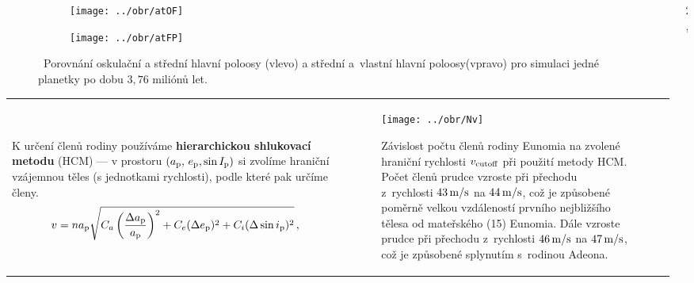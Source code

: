 \documentclass{beamer}
\newlength{\sep}
\newlength{\vyska}
\newlength{\vyskaA}
\newlength{\side}
\begin{document}
\begin{frame}
\begin{columns}[t]
\begin{column}{\side}
\begin{tcolorbox}[title=Metody\phantom{Úy},height=0.64\vyskaA]
		\begin{figure}
			\centering
			\begin{subfigure}[b]{0.49\textwidth}
			\centering
			\texttt{[image: ../obr/atOF]}
			\end{subfigure}
			\begin{subfigure}[b]{0.49\textwidth}
			\centering
			\texttt{[image: ../obr/atFP]}
			\end{subfigure}
			\caption{\ Porovnání oskulační a střední hlavní poloosy (vlevo) a střední a~vlastní hlavní poloosy(vpravo) pro simulaci jedné planetky po dobu $3,76$ miliónů let.}
		\end{figure}
		\begin{tabularx}{\textwidth}{ X X }

\

		K určení členů rodiny používáme \textbf{hierarchickou shlukovací metodu} (HCM) --- v prostoru $(a_{\rm p},\,e_{\rm p},\sin I_{\rm p})$ si zvolíme hraniční vzájemnou \uv{vzdálenost} těles (s jednotkami rychlosti), podle které pak určíme členy.
		{\footnotesize \begin{align*}
			v=na_{\rm p}\sqrt{C_a\left(\frac{\Delta a_{\rm p}}{a_{\rm p}}\right)^2+C_e(\Delta e_{\rm p})^2+C_i(\Delta \sin i_{\rm p})^2}\,,
		\end{align*}}
&
		\begin{figure}
			\centering
			\texttt{[image: ../obr/Nv]}
			\caption{Závislost počtu členů rodiny Eunomia na zvolené hraniční rychlosti $v_{\rm cutoff}$ při použití metody HCM. Počet členů prudce vzroste při přechodu z~rychlosti $43\,{\rm m/s}$ na $44\,{\rm m/s}$, což je způsobené poměrně velkou vzdáleností prvního nejbližšího tělesa od mateřského (15) Eunomia. Dále vzroste prudce při přechodu z~rychlosti $46\,{\rm m/s}$ na $47\,{\rm m/s}$, což je způsobené splynutím s~rodinou Adeona.}
		\end{figure}
		\end{tabularx}

	\end{tcolorbox}

\vspace{\sep}

\end{column}

\begin{column}{2\sep}
\end{column}


\end{columns}
\end{frame}
\end{document}
